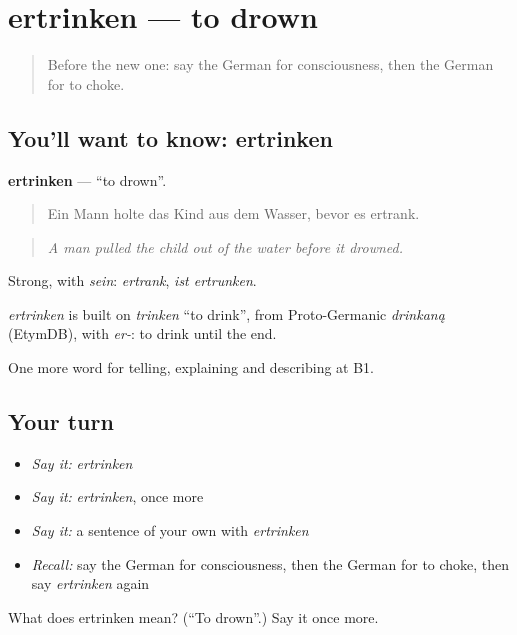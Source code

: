 \section[ertrinken]{ertrinken — to drown}

\label{lesson:GE-C290-ertrinken}



\begin{quote}
Before the new one: say the German for consciousness, then the German for to choke.
\end{quote}

\subsection*{You'll want to know: ertrinken}
\textbf{ertrinken} — \textquotedblleft{}to drown\textquotedblright{}.

\begin{quote}
Ein Mann holte das Kind aus dem Wasser, bevor es ertrank.
\end{quote}

\begin{quote}
\emph{A man pulled the child out of the water before it drowned.}
\end{quote}

Strong, with \emph{sein}: \emph{ertrank}, \emph{ist ertrunken}.

\begin{cousinweb}
\emph{ertrinken} is built on \emph{trinken} \textquotedblleft{}to drink\textquotedblright{}, from Proto-Germanic \emph{drinkaną} (EtymDB), with \emph{er-}: to drink until the end.
\end{cousinweb}

\begin{grammarlens}[title={What you've built}]
One more word for telling, explaining and describing at B1.
\end{grammarlens}

\subsection*{Your turn}
\begin{itemize}
\raggedright
  \item \emph{Say it:} \emph{ertrinken}
  \item \emph{Say it:} \emph{ertrinken}, once more
  \item \emph{Say it:} a sentence of your own with \emph{ertrinken}
  \item \emph{Recall:} say the German for consciousness, then the German for to choke, then say \emph{ertrinken} again
\end{itemize}

\begin{tcolorbox}[breakable,colback=teal!4,colframe=teal!35!black,title={Before you move on}]
What does ertrinken mean? (\textquotedblleft{}To drown\textquotedblright{}.) Say it once more.
\end{tcolorbox}
